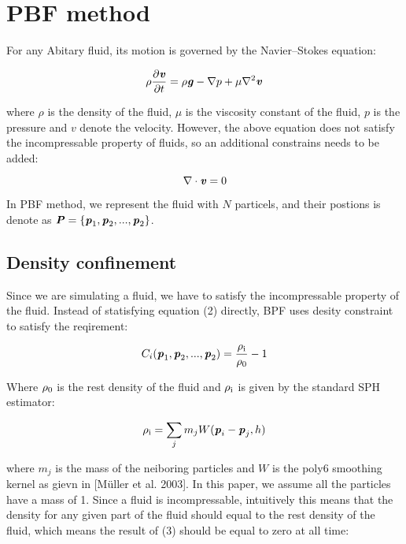 \documentclass[acmtog]{acmart}
\begin{document}
\section{PBF method}
For any Abitary fluid, its motion is governed by the Navier–Stokes equation:

\begin{equation}
  \rho \frac{\partial \textbf{\textit{v}}} {\partial t} = \rho \textbf{\textit{g}} - \nabla p + \mu \nabla^2 \textbf{\textit{v}}
\end{equation}

where $\rho$ is the density of the fluid, $\mu$ is the viscosity constant of the fluid, $p$ is the pressure and $v$ denote the velocity.
However, the above equation does not satisfy the incompressable property of fluids, so an additional constrains needs to be added:

\begin{equation}
\nabla \cdot \textbf{\textit{v}} = 0
\end{equation}

In PBF method, we represent the fluid with $N$ particels, and their postions is denote as 
$\textbf{\textit{P}} = \{\textbf{\textit{p}}_{1}, \textbf{\textit{p}}_{2}, ... , \textbf{\textit{p}}_{2} \}$.

\subsection{Density confinement}
Since we are simulating a fluid, we have to satisfy the incompressable property of the fluid. 
Instead of statisfying equation (2) directly, BPF uses desity constraint to satisfy the reqirement:

\begin{equation}
C_i(\textbf{\textit{p}}_{1}, \textbf{\textit{p}}_{2}, ... , \textbf{\textit{p}}_{2}) = \frac{\rho \textsubscript{i}} {\rho \textsubscript{0}} - 1
\end{equation}

Where $\rho \textsubscript{0}$ is the rest density of the fluid and $\rho \textsubscript{i}$ is given by the standard SPH estimator:

\begin{equation}
  \rho \textsubscript{i} = \sum_{j} m_j W(\textbf{\textit{p}}_{i} - \textbf{\textit{p}}_{j}, h)
\end{equation}

where $m_j$ is the mass of the neiboring particles and $W$ is the poly6 smoothing kernel as gievn in [Müller et al. 2003]. 
In this paper, we assume all the particles have a mass of 1.
Since a fluid is incompressable, intuitively this means that the density for any given part of the fluid should equal to the rest density
of the fluid, which means the result of (3) should be equal to zero at all time:
\end{document}
